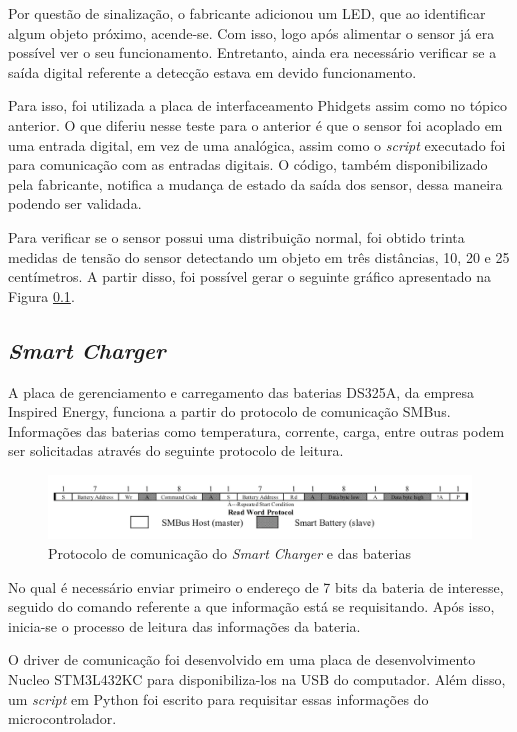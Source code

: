 		Por questão de sinalização, o fabricante adicionou um LED, que ao identificar algum objeto próximo, acende-se. Com isso, logo após alimentar o sensor já era possível ver o seu funcionamento. Entretanto, ainda era necessário verificar se a saída digital referente a detecção estava em devido funcionamento.
		
		Para isso, foi utilizada a placa de interfaceamento Phidgets assim como no tópico anterior. O que diferiu nesse teste para o anterior é que o sensor foi acoplado em uma entrada digital, em vez de uma analógica, assim como o \textit{script} executado foi para comunicação com as entradas digitais. O código, também disponibilizado pela fabricante, notifica a mudança de estado da saída dos sensor, dessa maneira podendo ser validada.
		
		Para verificar se o sensor possui uma distribuição normal, foi obtido trinta medidas de tensão do sensor detectando um objeto em três distâncias, 10, 20 e 25 centímetros. A partir disso, foi possível gerar o seguinte gráfico apresentado na Figura \ref{}.
		
	\subsection{\textit{Smart Charger}}
    
	    A placa de gerenciamento e carregamento das baterias DS325A, da empresa Inspired Energy, funciona a partir do protocolo de comunicação SMBus. Informações das baterias como temperatura, corrente, carga, entre outras podem ser solicitadas através do seguinte protocolo de leitura.
	    
	    \begin{figure}[!ht]
			   \centering
			   \includegraphics[width=16cm]{Figures/batt_protocol.png}
			   \caption{Protocolo de comunicação do \textit{Smart Charger} e das baterias}
			   \label{fig:batt_protocol}
		\end{figure}   
		
		No qual é necessário enviar primeiro o endereço de 7 bits da bateria de interesse, seguido do comando referente a que informação está se requisitando. Após isso, inicia-se o processo de leitura das informações da bateria.
		
		O driver de comunicação foi desenvolvido em uma placa de desenvolvimento Nucleo STM3L432KC para disponibiliza-los na USB do computador. Além disso, um \textit{script} em Python foi escrito para requisitar essas informações do microcontrolador.
		
